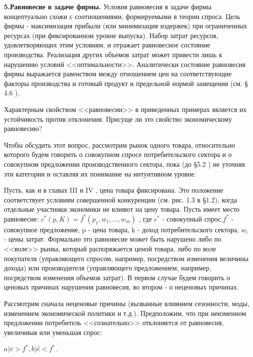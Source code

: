 \documentclass[12pt, 4paper]{book}
\begin{document}
{\textbf{5.Равновесие в задаче фирмы.} Условия равновесия в задаче фирмы концептуально схожи с соотношениями, формируемыми в теории спроса. Цель фирмы - максимизация прибыли (или минимизация издержек) при ограниченных ресурсах (при фиксированном уровне выпуска). Набор затрат ресурсов, удовлетворяющих этим условиям, и отражает равновесное состояние производства. Реализация других объемов затрат может привести лишь к нарушению условий <<оптимальности>>. Аналитически состояние равновесия фирмы выражается равенством между отношением цен на соответствующие факторы производства и готовый продукт и предельной нормой замещения (см. § 4.6 ).
\par

Характерным свойством <<равновесии>> в приведенных примерах является их устойчивость против отклонения. Присуще ли это свойство экономическому равновесию?
\par

Чтобы обсудить этот вопрос, рассмотрим рынок одного товара, относительно которого будем говорить о совокупном спросе потребительского сектора и о совокупном предложении производственного сектора, пока (до §5.2 ) не уточняя эти категории и оставляя их понимание на интуитивном уровне.
\par

Пусть, как и в главах III и IV , цена товара фиксирована. Это положение соответствует условиям совершенной конкуренции (см. рис. 1.3 в §1.2), когда отдельные участники экономики не влияют на цену товара. Пусть имеет место равновесие: $c^{*}(p,K)=f^{*}(p_1,w_1,...,w_m)$ , где $c^{*}$ - совокупный спрос,$f^{*}$ - совокупное предложение, p - цена товара, k - доход потребительского сектора, $w_i$ - цены затрат. Формально это равновесие может быть нарушено либо по <<воле>> рынка, который распоряжается ценой товара, либо по воле покупателя (управляющего спросом, например, посредством изменения величины дохода) или производителя (управляющего предложением, например, посредством изменения объемов затрат). В первом случае будем говорить о ценовых причинах нарушения равновесия, во втором - о неценовых причинах.
\par

Рассмотрим сначала неценовые причины (вызванные влиянием сезонности, моды, изменением экономической политики и т.д.). Предположим, что при неизменном предложении потребитель <<сознательно>> отклоняется от равновесия, увеличивая или уменьшая спрос:
\par

\begin{center}
$a) \bar{c}>f^{*}, b)\bar{\bar{c}}<f^{*}.$
\end{center}
\par

}
\end{document}
